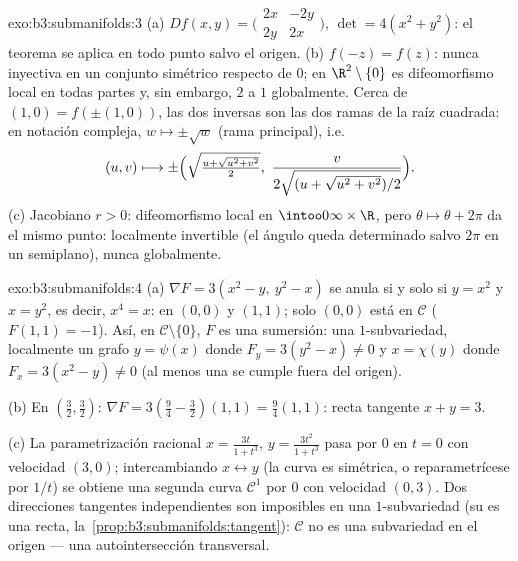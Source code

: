\begin{solution}{exo:b3:submanifolds:3}
(a) $Df(x,y) = \bigl(\begin{smallmatrix}2x & -2y\\ 2y &
2x\end{smallmatrix}\bigr)$, $\det = 4(x^2 + y^2)$: el teorema se aplica
en todo punto salvo el origen. (b) $f(-z) = f(z)$: nunca inyectiva en un
conjunto simétrico respecto de $0$; en $\R^2\setminus\{0\}$ es
difeomorfismo local en todas partes y, sin embargo, $2$ a $1$
globalmente. Cerca de $(1, 0) = f(\pm(1,
0))$, las dos inversas son las dos ramas de la raíz cuadrada: en
notación compleja, $w \mapsto \pm\sqrt w$ (rama principal),
i.e.
\[
(u, v) \longmapsto \pm\Bigl(\sqrt{\tfrac{u +
\sqrt{u^2+v^2}}{2}},\ \frac{v}{2\sqrt{(u +
\sqrt{u^2+v^2})/2}}\Bigr).
\]
(c) Jacobiano $r > 0$: difeomorfismo local en $\intoo0\infty\times\R$,
pero $\theta \mapsto \theta + 2\pi$ da el mismo punto: localmente
invertible (el ángulo queda determinado salvo $2\pi$ en un semiplano),
nunca globalmente.
\end{solution}

\begin{solution}{exo:b3:submanifolds:4}
(a) $\nabla F = 3(x^2 - y,\ y^2 - x)$ se anula si y solo si $y = x^2$ y
$x = y^2$, es decir, $x^4 = x$: en $(0,0)$ y $(1,1)$; solo $(0,0)$ está
en $\mathcal C$ ($F(1,1) = -1$). Así, en $\mathcal
C\setminus\{0\}$, $F$ es una sumersión: una $1$-subvariedad, localmente
un grafo $y = \psi(x)$ donde $F_y = 3(y^2 - x) \neq 0$ y $x = \chi(y)$
donde $F_x = 3(x^2 - y) \neq 0$ (al menos una se cumple fuera del
origen).

(b) En $(\frac32, \frac32)$: $\nabla F = 3(\frac94 - \frac32)
(1, 1) = \frac94(1,1)$: recta tangente $x + y = 3$.

(c) La parametrización racional $x = \frac{3t}{1 + t^3}$,
$y = \frac{3t^2}{1+t^3}$ pasa por $0$ en $t = 0$ con velocidad $(3, 0)$;
intercambiando $x \leftrightarrow y$ (la curva es simétrica, o
reparametrícese por $1/t$) se obtiene una segunda curva $\mathcal C^1$
por $0$ con velocidad $(0, 3)$. Dos direcciones tangentes independientes
son imposibles en una $1$-subvariedad (su
 es una recta,
la~\cref{prop:b3:submanifolds:tangent}): $\mathcal C$ no es una
subvariedad en el origen --- una autointersección transversal.
\end{solution}

